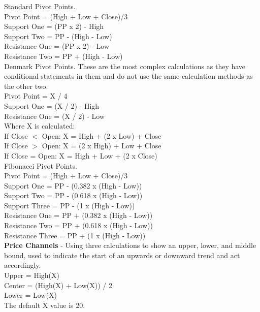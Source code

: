 \documentclass[12pt,a4paper]{article}
\begin{document}
\noindent
Standard Pivot Points. \\
Pivot Point = (High + Low + Close)/3\\
Support One = (PP x 2) - High\\
Support Two = PP - (High - Low)\\
Resistance One = (PP x 2) - Low\\
Resistance Two = PP + (High - Low)\\

\noindent
Denmark Pivot Points. These are the most complex calculations as they have conditional statements in them and do not use the same calculation methods as the other two.\\
Pivot Point = X / 4\\
Support One = (X / 2) - High\\
Resistance One = (X / 2) - Low\\

\noindent
Where X is calculated: \\
If Close $<$ Open: X = High + (2 x Low) + Close\\
If Close $>$ Open: X = (2 x High) + Low + Close\\
If Close = Open: X = High + Low + (2 x Close)\\

\noindent
Fibonacci Pivot Points. \\
Pivot Point = (High + Low + Close)/3\\
Support One = PP - (0.382 x (High  -  Low))\\
Support Two = PP - (0.618 x (High  -  Low))\\
Support Three = PP - (1 x (High  -  Low))\\
Resistance One = PP + (0.382 x (High  -  Low))\\
Resistance Two = PP + (0.618 x (High  -  Low))\\
Resistance Three = PP + (1 x (High  -  Low))\\

\iffalse
[]
\fi

\noindent
\textbf{Price Channels} - Using three calculations to show an upper, lower, and middle bound, used to indicate the start of an upwards or downward trend and act accordingly.\\

\noindent
Upper = High(X)\\
Center = (High(X) + Low(X)) / 2\\
Lower = Low(X)\\
The default X value is 20.\\
\end{document}
